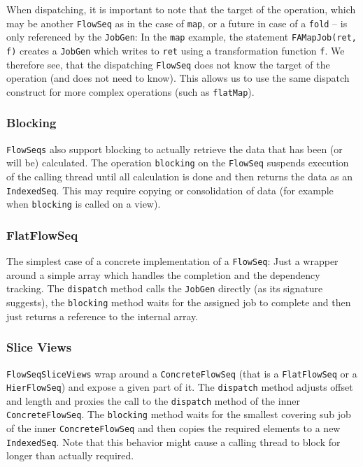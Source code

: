 \documentclass[runningheads,a4paper,fleqn]{llncs}
\begin{document}
When dispatching, it is important to note that the target of the
operation, which may be another \texttt{FlowSeq} as in the case of
\texttt{map}, or a future in case of a \texttt{fold} -- is only
referenced by the \texttt{JobGen}: In the \texttt{map} example, the
statement \texttt{FAMapJob(ret, f)} creates a
\texttt{JobGen} which writes to \texttt{ret} using a transformation
function \texttt{f}. We therefore see, that the dispatching \texttt{FlowSeq}
does not know the target of the operation (and does not need to
know). This allows us to use the same dispatch construct for more
complex operations (such as \texttt{flatMap}).

\subsubsection{Blocking}
\texttt{FlowSeqs} also support blocking to actually retrieve the data that
has been (or will be) calculated. The operation \texttt{blocking} on
the \texttt{FlowSeq} suspends execution of the calling thread until all
calculation is done and then returns the data as an
\texttt{IndexedSeq}. This may require copying or consolidation of data
(for example when \texttt{blocking} is called on a view).

\subsubsection{FlatFlowSeq}
The simplest case of a concrete implementation of a \texttt{FlowSeq}: Just a
wrapper around a simple array which handles the completion and the
dependency tracking. The \texttt{dispatch} method calls the
\texttt{JobGen} directly (as its signature suggests), the
\texttt{blocking} method waits for the assigned job to complete and
then just returns a reference to the internal array.

\subsubsection{Slice Views}
\label{sssec:slice-views}
\texttt{FlowSeqSliceViews} wrap around a \texttt{ConcreteFlowSeq}
(that is a \texttt{FlatFlowSeq} or a \texttt{HierFlowSeq})
and expose a given part of it. The \texttt{dispatch} method adjusts 
offset and length and proxies the call to the \texttt{dispatch} method
of the inner
\texttt{ConcreteFlowSeq}. The \texttt{blocking} method waits for the
smallest covering sub job of the inner \texttt{ConcreteFlowSeq} and
then copies the required elements to a new \texttt{IndexedSeq}. Note
that this behavior might cause a calling thread to block for longer
than actually required.
\end{document}
